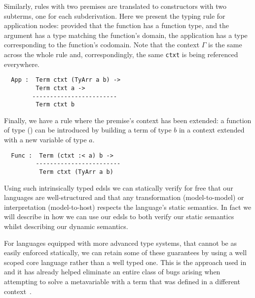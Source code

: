 Similarly, rules with two premises are translated to constructors
with two subterms, one for each subderivation.
%
Here we present the typing rule for application nodes: provided that
the function has a function type, and the argument has a type matching
the function's domain, the application has a type corresponding to the
function's codomain.
Note that the context $\Gamma$ is the same across the whole rule and,
correspondingly, the same \texttt{ctxt} is being referenced everywhere.

\begin{minipage}{0.35\textwidth}
\inferenceApp
\end{minipage}\hfill
\begin{minipage}{0.55\textwidth}
\begin{Verbatim}
  App :  Term ctxt (TyArr a b) ->
         Term ctxt a ->
        ------------------------
         Term ctxt b
\end{Verbatim}
\end{minipage}

Finally, we have a rule where the premise's context has been extended:
a function of type () can be introduced by building a term
of type $b$ in a context extended with a new variable of type $a$.

\begin{minipage}{0.35\textwidth}
\inferenceFunc
\end{minipage}\hfill
\begin{minipage}{0.55\textwidth}
\begin{Verbatim}
  Func :  Term (ctxt :< a) b ->
         ------------------------
          Term ctxt (TyArr a b)
\end{Verbatim}
\end{minipage}






\noindent
Using such intrinsically typed \acp{edsl} we can statically verify for free
that our languages are well-structured and that any transformation (model-to-model)
or interpretation (model-to-host) respects the language's static semantics.
%
In fact we will describe in  how we can use our \acp{edsl}
to both verify our static semantics whilst describing our dynamic semantics.

For languages equipped with more advanced type systems, that cannot be as easily
enforced statically, we can retain some of these guarantees by using a well
scoped core language rather than a well typed one.
%
This is the approach used in \Idris{} and it has already helped eliminate an
entire class of bugs arising when attempting to solve a metavariable with a
term that was defined in a different context~\cite{DBLP:conf/ecoop/Brady21}.
